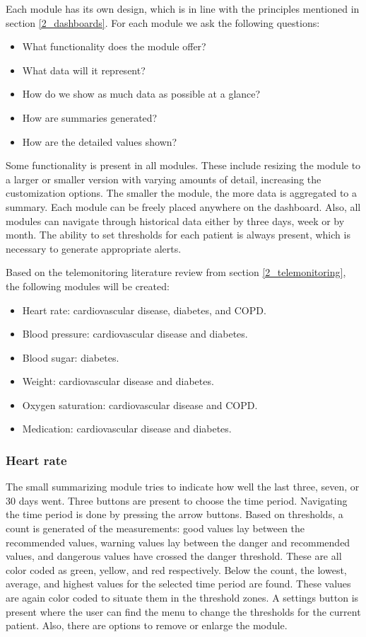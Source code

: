     Each module has its own design, which is in line with the principles mentioned in section \ref{2_dashboards}. For each module we ask the following questions:
    \begin{itemize}
        \item What functionality does the module offer?
        \item What data will it represent?
        \item How do we show as much data as possible at a glance?
        \item How are summaries generated?
        \item How are the detailed values shown?
    \end{itemize}

    Some functionality is present in all modules. These include resizing the module to a larger or smaller version with varying amounts of detail, increasing the customization options. The smaller the module, the more data is aggregated to a summary. Each module can be freely placed anywhere on the dashboard. Also, all modules can navigate through historical data either by three days, week or by month. The ability to set thresholds for each patient is always present, which is necessary to generate appropriate alerts.

    Based on the telemonitoring literature review from section \ref{2_telemonitoring}, the following modules will be created:
    \begin{itemize}
        \item Heart rate: cardiovascular disease, diabetes, and COPD.
        \item Blood pressure: cardiovascular disease and diabetes.
        \item Blood sugar: diabetes.
        \item Weight: cardiovascular disease and diabetes.
        \item Oxygen saturation: cardiovascular disease and COPD.
        \item Medication: cardiovascular disease and diabetes.
    \end{itemize}

        \subsubsection{Heart rate}

        The small summarizing module tries to indicate how well the last three, seven, or 30 days went. Three buttons are present to choose the time period. Navigating the time period is done by pressing the arrow buttons. Based on thresholds, a count is generated of the measurements: good values lay between the recommended values, warning values lay between the danger and recommended values, and dangerous values have crossed the danger threshold. These are all color coded as green, yellow, and red respectively. Below the count, the lowest, average, and highest values for the selected time period are found. These values are again color coded to situate them in the threshold zones. A settings button is present where the user can find the menu to change the thresholds for the current patient. Also, there are options to remove or enlarge the module.

